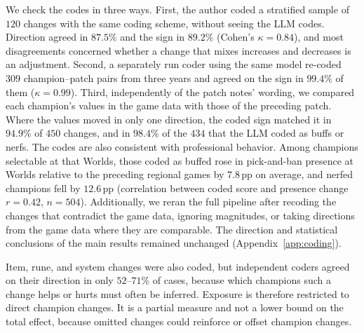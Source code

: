 \documentclass[11pt]{article}
\newcommand{\pp}{\,pp}
\begin{document}
We check the codes in three ways. First, the author coded a stratified sample of $120$ changes with the same coding scheme, without seeing the LLM codes. Direction agreed in $87.5\%$ and the sign in $89.2\%$ (Cohen's $\kappa = 0.84$), and most disagreements concerned whether a change that mixes increases and decreases is an adjustment. Second, a separately run coder using the same model re-coded $309$ champion--patch pairs from three years and agreed on the sign in $99.4\%$ of them ($\kappa = 0.99$). Third, independently of the patch notes' wording, we compared each champion's values in the game data with those of the preceding patch. Where the values moved in only one direction, the coded sign matched it in $94.9\%$ of $450$ changes, and in $98.4\%$ of the $434$ that the LLM coded as buffs or nerfs. The codes are also consistent with professional behavior. Among champions selectable at that Worlds, those coded as buffed rose in pick-and-ban presence at Worlds relative to the preceding regional games by $7.8$\pp{} on average, and nerfed champions fell by $12.6$\pp{} (correlation between coded score and presence change $r = 0.42$, $n = 504$). Additionally, we reran the full pipeline after recoding the changes that contradict the game data, ignoring magnitudes, or taking directions from the game data where they are comparable. The direction and statistical conclusions of the main results remained unchanged (Appendix~\ref{app:coding}).

Item, rune, and system changes were also coded, but independent coders agreed on their direction in only $52$--$71\%$ of cases, because which champions such a change helps or hurts must often be inferred. Exposure is therefore restricted to direct champion changes. It is a partial measure and not a lower bound on the total effect, because omitted changes could reinforce or offset champion changes.
\end{document}
